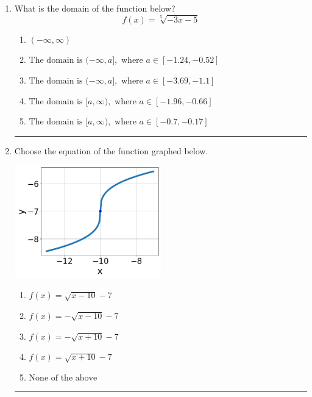 \documentclass[14pt]{extbook}
\newcommand{\litem}[1]{\item#1\hspace*{-1cm}\rule{\textwidth}{0.4pt}}
\begin{document}
\begin{enumerate}
{\begin{enumerate}[label=\Alph*.]
\end{enumerate} }
\litem{
What is the domain of the function below?\[ f(x) = \sqrt[5]{-3 x - 5} \]\begin{enumerate}[label=\Alph*.]
\item \( (-\infty, \infty) \)
\item \( \text{The domain is } (-\infty, a], \text{   where } a \in [-1.24, -0.52] \)
\item \( \text{The domain is } (-\infty, a], \text{   where } a \in [-3.69, -1.1] \)
\item \( \text{The domain is } [a, \infty), \text{   where } a \in [-1.96, -0.66] \)
\item \( \text{The domain is } [a, \infty), \text{   where } a \in [-0.7, -0.17] \)

\end{enumerate} }
\litem{
Choose the equation of the function graphed below.
\begin{center}
    \includegraphics[width=0.5\textwidth]{../Figures/radicalGraphToEquationA.png}
\end{center}
\begin{enumerate}[label=\Alph*.]
\item \( f(x) = \sqrt{x - 10} - 7 \)
\item \( f(x) = - \sqrt{x - 10} - 7 \)
\item \( f(x) = - \sqrt{x + 10} - 7 \)
\item \( f(x) = \sqrt{x + 10} - 7 \)
\item \( \text{None of the above} \)

\end{enumerate} }
\end{enumerate}
\end{document}
